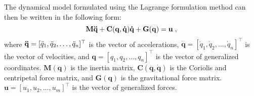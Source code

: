The dynamical model formulated using the Lagrange formulation method can then be written in the following form:
\begin{equation}
\label{eq:lagdyn}
    \mathbf{M}\mathbf{\Ddot{q}} + \mathbf{C(q,\Dot{q})}\mathbf{\Dot{q}} + \mathbf{G(q)} = \mathbf{u}\;,
\end{equation}
where $\mathbf{\Ddot{q}} = [\Ddot{q}_1, \Ddot{q}_2, \dots, \Ddot{q}_n]^{\top}$ is the vector of accelerations, $\mathbf{\Dot{q}} = [\Dot{q}_1, \Dot{q}_2, \dots, \Dot{q}_n]^{\top}$ is the vector of velocities, and $\mathbf{q} = [q_1, q_2, \dots, q_n]^{\top}$ is the vector of generalized coordinates.  $\mathbf{M(q)}$ is the inertia matrix, $\mathbf{C(q,\Dot{q})}$ is the Coriolis and centripetal force matrix, and $\mathbf{G(q)}$ is the gravitational force matrix. $\mathbf{u} = [u_1, u_2, \dots, u_m]^{\top}$ is the vector of generalized forces.
\pagebreak